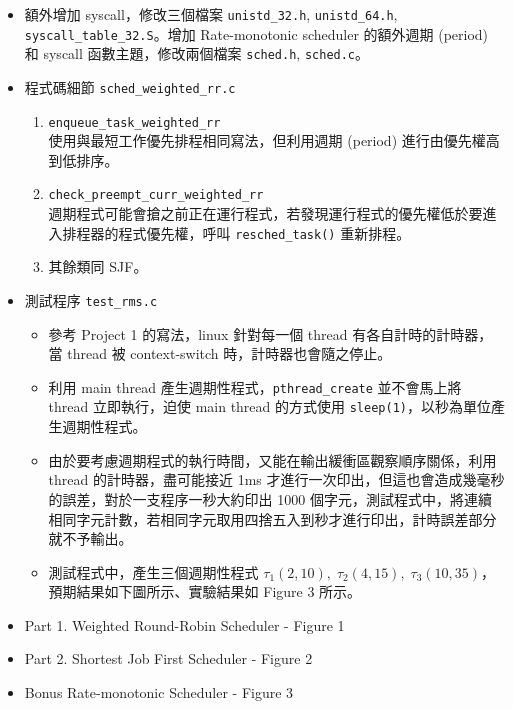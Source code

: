 \documentclass{res}
\begin{document}
\begin{resume}
\begin{itemize}
	\item 額外增加 syscall，修改三個檔案 \lstinline{unistd_32.h}, \lstinline{unistd_64.h}, \lstinline{syscall_table_32.S}。增加 Rate-monotonic scheduler 的額外週期 (period) 和 syscall 函數主題，修改兩個檔案 \lstinline{sched.h}, \lstinline{sched.c}。
	\item 程式碼細節 \lstinline{sched_weighted_rr.c}
		\begin{enumerate}
			\item \lstinline{enqueue_task_weighted_rr} \\
			使用與最短工作優先排程相同寫法，但利用週期 (period) 進行由優先權高到低排序。
			\item \lstinline{check_preempt_curr_weighted_rr} \\
			週期程式可能會搶之前正在運行程式，若發現運行程式的優先權低於要進入排程器的程式優先權，呼叫 \lstinline{resched_task()} 重新排程。
			\item 其餘類同 SJF。
		\end{enumerate}
	\item 測試程序 \lstinline{test_rms.c}
		\begin{itemize}
		\item 參考 Project 1 的寫法，linux 針對每一個 thread 有各自計時的計時器，當 thread 被 context-switch 時，計時器也會隨之停止。
		\item 利用 main thread 產生週期性程式，\lstinline{pthread_create} 並不會馬上將 thread 立即執行，迫使 main thread 的方式使用 \lstinline{sleep(1)}，以秒為單位產生週期性程式。
		\item 由於要考慮週期程式的執行時間，又能在輸出緩衝區觀察順序關係，利用 thread 的計時器，盡可能接近 1ms 才進行一次印出，但這也會造成幾毫秒的誤差，對於一支程序一秒大約印出 1000 個字元，測試程式中，將連續相同字元計數，若相同字元取用四捨五入到秒才進行印出，計時誤差部分就不予輸出。
		\item 測試程式中，產生三個週期性程式 $\tau_{1}(2, 10), \; \tau_{2}(4, 15), \; \tau_{3}(10, 35)$，預期結果如下圖所示、實驗結果如 Figure 3 所示。
		\end{itemize}
\end{itemize}



\vspace*{.1in} 

\begin{itemize}
	\item Part 1. Weighted Round-Robin Scheduler - Figure 1
	\item Part 2. Shortest Job First Scheduler - Figure 2
	\item Bonus Rate-monotonic Scheduler - Figure 3
\end{itemize}


\end{resume}
\end{document}
